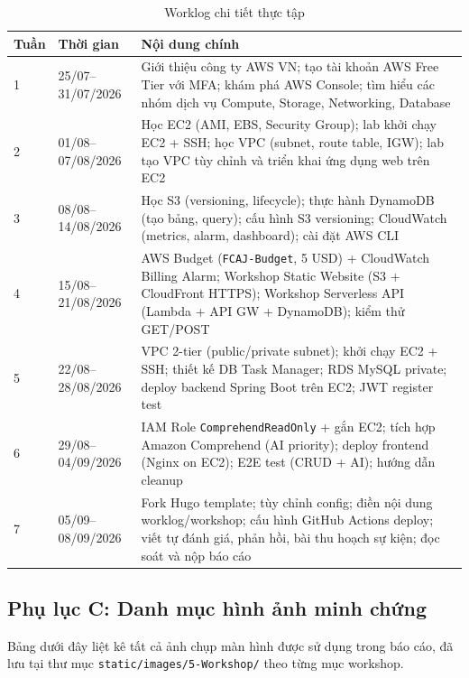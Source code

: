 \documentclass[13pt]{extarticle}
\begin{document}
\begin{longtable}{p{1.5cm}p{2.5cm}p{10cm}}
\caption{Worklog chi tiết thực tập}
\label{tab:worklog} \\
\toprule
\textbf{Tuần} & \textbf{Thời gian} & \textbf{Nội dung chính} \\
\midrule
\endhead
1 & 25/07--31/07/2026 & Giới thiệu công ty AWS VN; tạo tài khoản AWS Free
Tier với MFA; khám phá AWS Console; tìm hiểu các nhóm dịch vụ Compute,
Storage, Networking, Database \\
2 & 01/08--07/08/2026 & Học EC2 (AMI, EBS, Security Group); lab khởi chạy
EC2 + SSH; học VPC (subnet, route table, IGW); lab tạo VPC tùy chỉnh và
triển khai ứng dụng web trên EC2 \\
3 & 08/08--14/08/2026 & Học S3 (versioning, lifecycle); thực hành DynamoDB
(tạo bảng, query); cấu hình S3 versioning; CloudWatch (metrics, alarm,
dashboard); cài đặt AWS CLI \\
4 & 15/08--21/08/2026 & AWS Budget (\texttt{FCAJ-Budget}, 5 USD) + CloudWatch
Billing Alarm; Workshop Static Website (S3 + CloudFront HTTPS); Workshop
Serverless API (Lambda + API GW + DynamoDB); kiểm thử GET/POST \\
5 & 22/08--28/08/2026 & VPC 2-tier (public/private subnet); khởi chạy EC2
+ SSH; thiết kế DB Task Manager; RDS MySQL private; deploy backend Spring
Boot trên EC2; JWT register test \\
6 & 29/08--04/09/2026 & IAM Role \texttt{ComprehendReadOnly} + gắn EC2;
tích hợp Amazon Comprehend (AI priority); deploy frontend (Nginx on EC2);
E2E test (CRUD + AI); hướng dẫn cleanup \\
7 & 05/09--08/09/2026 & Fork Hugo template; tùy chỉnh config; điền nội
dung worklog/workshop; cấu hình GitHub Actions deploy; viết tự đánh giá,
phản hồi, bài thu hoạch sự kiện; đọc soát và nộp báo cáo \\
\bottomrule
\end{longtable}

\subsection*{Phụ lục C: Danh mục hình ảnh minh chứng}

Bảng dưới đây liệt kê tất cả ảnh chụp màn hình được sử dụng trong báo cáo,
đã lưu tại thư mục \texttt{static/images/5-Workshop/} theo từng mục workshop.
\end{document}
